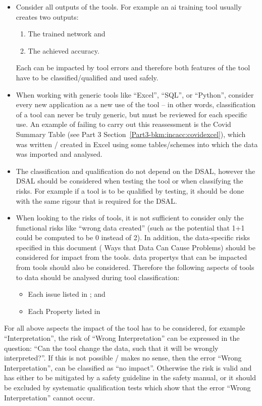 \begin{itemize}
\item Consider all outputs of the tools.
  For example an \gls{ai} training tool usually creates two outputs:
  \begin{enumerate}
  \item The trained network and
  \item The achieved \gls{accuracy}.
  \end{enumerate}
  Each can be impacted by tool errors and therefore both features of the tool have to be classified/qualified  and used safely.
\item When working with generic tools like ``Excel'', ``SQL'', or ``Python'',
consider every new application as a new use of the tool -- in other words, classification of a tool can never be truly generic, but must be reviewed for each specific use. 
  An example of failing to carry out this reassessment is the Covid Summary Table (see Part 3 Section~\ref*{Part3-bkm:incacc:covidexcel}),
  which was written / created in Excel using some tables/schemes into which the data was imported and analysed.
\item The classification and qualification do not depend on the DSAL, however the DSAL should be considered when testing the tool or when classifying the risks.
  For example if a tool is to be qualified by testing, it should be done with the same rigour that is required  for the DSAL. 
\item When looking to the risks of tools, it is not sufficient to consider only the functional risks like ``wrong data created''
  (such as the potential that 1+1 could be computed to be 0 instead of 2).
  In addition, the data-specific risks specified in this document
  ( Ways that Data Can Cause  Problems) should be considered for impact from the tools.
  \Glspl{data property} that can be impacted from tools should also be considered.
  Therefore the following aspects of tools to data should be analysed during tool classification:
  \begin{itemize}
  \item Each issue listed in ; and
  \item Each Property listed in 
  \end{itemize}    
\end{itemize}

For all above aspects the impact of the tool has to be considered, for example ``Interpretation'',
the risk of ``Wrong Interpretation'' can be expressed in the question:
``Can the tool change the data, such that it will be wrongly interpreted?''.
If this is not possible / makes no sense, then the error ``Wrong Interpretation'', can be classified as ``no impact''.
Otherwise the risk is valid and has either to be mitigated by a safety guideline in the safety manual,
or it should be excluded by systematic qualification  tests which show that the error ``Wrong Interpretation'' cannot occur.  
